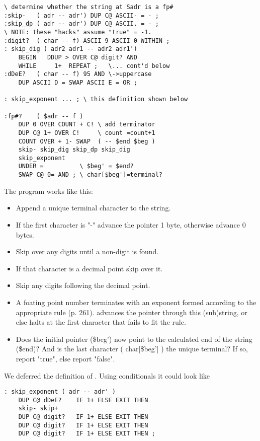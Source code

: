 \begin{lstlisting}
\ determine whether the string at Sadr is a fp#
:skip-   ( adr -- adr') DUP C@ ASCII- = - ;
:skip_dp ( adr -- adr') DUP C@ ASCII. = - ;
\ NOTE: these "hacks" assume "true" = -1.
:digit?  ( char -- f) ASCII 9 ASCII 0 WITHIN ;
: skip_dig ( adr2 adr1 -- adr2 adr1')
    BEGIN   DDUP > OVER C@ digit? AND
    WHILE     1+  REPEAT ;   \... cont'd below
:dDeE?   ( char -- f) 95 AND \->uppercase
    DUP ASCII D = SWAP ASCII E = OR ;

: skip_exponent ... ; \ this definition shown below

:fp#?    ( $adr -- f )
    DUP 0 OVER COUNT + C! \ add terminator
    DUP C@ 1+ OVER C!     \ count =count+1
    COUNT OVER + 1- SWAP  ( -- $end $beg )
    skip- skip_dig skip_dp skip_dig
    skip_exponent
    UNDER =          \ $beg' = $end?
    SWAP C@ 0= AND ; \ char[$beg']=terminal?
\end{lstlisting}

The program works like this:

\begin{itemize}
    \item Append a unique terminal character to the string.
    \item If the first character is "-" advance the pointer 1 byte, otherwise advance 0 bytes.
    \item Skip over any digits until a non-digit is found.
    \item If that character is a decimal point skip over it.
    \item Skip any digits following the decimal point.
    \item A foating point number terminates with an exponent formed according to the appropriate rule (p. 261).  advances the pointer through this (sub)string, or else halts at the first character that fails to fit the rule.
    \item Does the initial pointer (\$beg') now point to the calculated end of the string (\$end)? And is the last character ( char[\$beg'] ) the unique terminal? If so, report "true", else report "false".
\end{itemize}

We deferred the definition of . Using conditionals it could look like

\begin{lstlisting}
: skip_exponent ( adr -- adr' )
    DUP C@ dDeE?    IF 1+ ELSE EXIT THEN
    skip- skip+
    DUP C@ digit?   IF 1+ ELSE EXIT THEN
    DUP C@ digit?   IF 1+ ELSE EXIT THEN
    DUP C@ digit?   IF 1+ ELSE EXIT THEN ;
\end{lstlisting}

